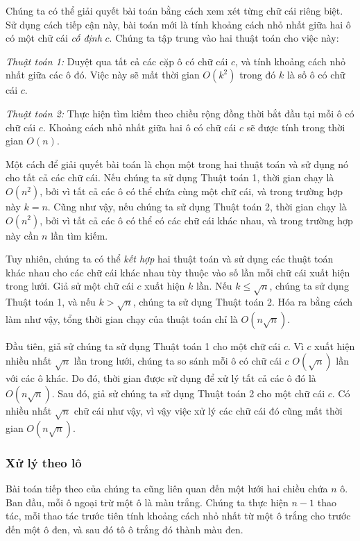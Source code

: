 Chúng ta có thể giải quyết bài toán bằng cách xem xét từng chữ cái riêng biệt.
Sử dụng cách tiếp cận này, bài toán mới là tính
khoảng cách nhỏ nhất
giữa hai ô có một chữ cái \emph{cố định} $c$.
Chúng ta tập trung vào hai thuật toán cho việc này:

\emph{Thuật toán 1:} Duyệt qua tất cả các cặp ô có chữ cái $c$,
và tính khoảng cách nhỏ nhất giữa các ô đó.
Việc này sẽ mất thời gian $O(k^2)$ trong đó $k$ là số ô có chữ cái $c$.

\emph{Thuật toán 2:} Thực hiện tìm kiếm theo chiều rộng đồng thời
bắt đầu tại mỗi ô có chữ cái $c$. Khoảng cách nhỏ nhất giữa
hai ô có chữ cái $c$ sẽ được tính trong thời gian $O(n)$.

Một cách để giải quyết bài toán là chọn một trong hai
thuật toán và sử dụng nó cho tất cả các chữ cái.
Nếu chúng ta sử dụng Thuật toán 1, thời gian chạy là $O(n^2)$,
bởi vì tất cả các ô có thể chứa cùng một chữ cái,
và trong trường hợp này $k=n$.
Cũng như vậy, nếu chúng ta sử dụng Thuật toán 2, thời gian chạy là $O(n^2)$,
bởi vì tất cả các ô có thể có các chữ cái khác nhau,
và trong trường hợp này cần $n$ lần tìm kiếm.

Tuy nhiên, chúng ta có thể \emph{kết hợp} hai thuật toán và
sử dụng các thuật toán khác nhau cho các chữ cái khác nhau
tùy thuộc vào số lần mỗi chữ cái xuất hiện trong lưới.
Giả sử một chữ cái $c$ xuất hiện $k$ lần.
Nếu $k \le \sqrt n$, chúng ta sử dụng Thuật toán 1, và nếu $k > \sqrt n$,
chúng ta sử dụng Thuật toán 2.
Hóa ra bằng cách làm như vậy, tổng thời gian chạy
của thuật toán chỉ là $O(n \sqrt n)$.

Đầu tiên, giả sử chúng ta sử dụng Thuật toán 1 cho một chữ cái $c$.
Vì $c$ xuất hiện nhiều nhất $\sqrt n$ lần trong lưới,
chúng ta so sánh mỗi ô có chữ cái $c$ $O(\sqrt n)$ lần
với các ô khác.
Do đó, thời gian được sử dụng để xử lý tất cả các ô đó là $O(n \sqrt n)$.
Sau đó, giả sử chúng ta sử dụng Thuật toán 2 cho một chữ cái $c$.
Có nhiều nhất $\sqrt n$ chữ cái như vậy,
vì vậy việc xử lý các chữ cái đó cũng mất thời gian $O(n \sqrt n)$.

\subsubsection{Xử lý theo lô}

Bài toán tiếp theo của chúng ta cũng liên quan đến
một lưới hai chiều chứa $n$ ô.
Ban đầu, mỗi ô ngoại trừ một ô là màu trắng.
Chúng ta thực hiện $n-1$ thao tác, mỗi thao tác trước tiên
tính khoảng cách nhỏ nhất từ một ô trắng cho trước
đến một ô đen, và sau đó tô ô trắng đó thành màu đen.

